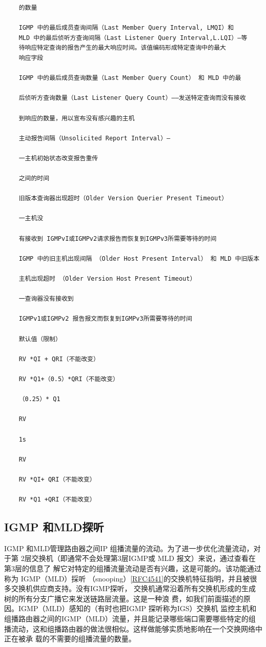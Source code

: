 \begin{verbatim}
    的数量
    
    IGMP 中的最后成员查询间隔（Last Member Query Interval, LMQI）和
    MLD 中的最后侦听方查询间隔（Last Listener Query Interval,L.LQI）—等
    待响应特定查询的报告产生的最大响应时间。该值编码形成特定查询中的最大
    响应字段
    
    IGMP 中的最后成员查询数量（Last Member Query Count） 和 MLD 中的最
    
    后侦听方查询数量（Last Listener Query Count）——发送特定查询而没有接收
    
    到响应的数量，用以宣布没有感兴趣的主机
    
    主动报告间隔（Unsolicited Report Interval）—
    
    一主机初始状态改变报告重传
    
    之间的时间
    
    旧版本查询器出现超时（Older Version Querier Present Timeout）
    
    一主机没
    
    有接收到 IGMPvI或IGMPv2请求报告而恢复到IGMPv3所需要等待的时间
    
    IGMP 中的旧主机出现间隔 （Older Host Present Interval） 和 MLD 中旧版本
    
    主机出现超时 （Older Version Host Present Timeout）
    
    一查询器没有接收到
    
    IGMPv1或IGMPv2 报告报文而恢复到IGMPv3所需要等待的时间
    
    默认值（限制）
    
    RV *QI + QRI（不能改变）
    
    RV *Q1+（0.5）*QRI（不能改变）
    
    （0.25）* Q1
    
    RV
    
    1s
    
    RV
    
    RV *QI+ QRI（不能改变）
    
    RV *Q1 +QRI（不能改变）
\end{verbatim}

\subsection{IGMP 和MLD探听}
IGMP 和MLD管理路由器之间IP 组播流量的流动。为了进一步优化流量流动，对于第
2层交换机（即通常不会处理第3层IGMP或 MLD 报文）来说，通过查看在第3层的信息了
解它对特定的组播流量流动是否有兴趣，这是可能的。该功能通过称为 IGMP（MLD）採听
（snooping）\href{https://www.rfc-editor.org/rfc/rfc4541}{[RFC4541]}的交换机特征指明，并且被很多交换机供应商支持。没有IGMP探听，
交换机通常沿着所有交换机形成的生成树的所有分支广播它来发送链路层流量。这是一种浪
费，如我们前面描述的原因。IGMP（MLD）感知的（有时也把IGMP 探听称为IGS）交换机
监控主机和组播路由器之间的IGMP（MLD）流量，并且能记录哪些端口需要哪些特定的组
播流动，这和组播路由器的做法很相似。这样做能够实质地影响在一个交换网络中正在被承
载的不需要的组播流量的数量。

